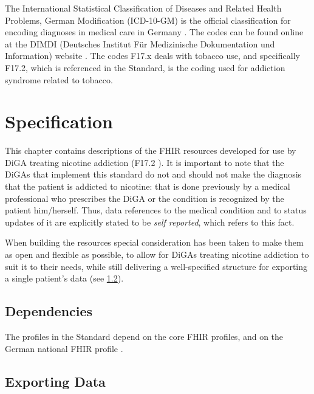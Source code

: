\documentclass[12px]{report}
\newcommand{\fhir}{FHIR\textsuperscript{\textregistered}}
\begin{document}
The International Statistical Classification of Diseases and Related Health Problems, German Modification (ICD-10-GM) is the official classification for encoding diagnoses in medical care in Germany \cite{icd}.
The codes can be found online at the DIMDI (Deutsches Institut Für Medizinische Dokumentation und Information) website \cite{dimdi}. The codes F17.x deals with tobacco use, and specifically F17.2, which is referenced in the Standard,
is the coding used for addiction syndrome related to tobacco.


\chapter{Specification}
\label{ch:spec}

This chapter contains descriptions of the FHIR resources developed for use by DiGA treating nicotine addiction (F17.2 \cite{dimdi}). It is important to note that the DiGAs that implement this standard do not and should not
make the diagnosis that the patient is addicted to nicotine: that is done previously by a medical professional who prescribes the DiGA or the condition is recognized by the patient him/herself. 
Thus, data references to the medical condition and to status updates of it are explicitly stated to be \textit{self reported}, which refers to this fact.

When building the resources special consideration has been taken to make them as open and flexible as possible, to allow for DiGAs treating nicotine addiction to suit it to their needs, while still delivering a
well-specified structure for exporting a single patient's data (see \ref{sec:export}).


\section{Dependencies}

The profiles in the Standard depend on the core \fhir \cite{FHIR} profiles, and on the German national FHIR profile \cite{debasis}.

\section{Exporting Data}
\label{sec:export}
\end{document}
